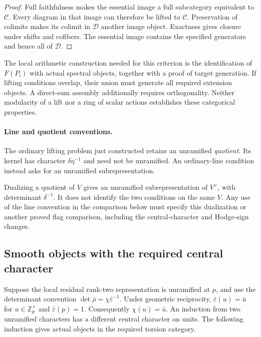 \begin{proof}
Full faithfulness makes the essential image a full subcategory
equivalent to $\mathcal C$. Every diagram in that image can
therefore be lifted to $\mathcal C$.
Preservation of colimits makes its colimit in $\mathcal D$ another
image object. Exactness gives closure under shifts and cofibers.
The essential image contains the specified generators and hence
all of $\mathcal D$.
\end{proof}

The local arithmetic construction needed for this criterion is the
identification of $F(P_i)$ with actual spectral objects, together
with a proof of target generation. If lifting conditions overlap,
their union must generate all required extension objects.
A direct-sum assembly additionally requires orthogonality.
Neither modularity of a lift nor a ring of scalar actions establishes
these categorical properties.

\paragraph{Line and quotient conventions.}
The ordinary lifting problem just constructed retains an unramified
\emph{quotient}. Its kernel has character $\delta\eta^{-1}$ and need
not be unramified. An ordinary-line condition instead asks for
an unramified subrepresentation.

Dualizing a quotient
of $V$ gives an unramified subrepresentation of $V^\vee$, with determinant
$\delta^{-1}$. It does not identify the two conditions on the same $V$.
Any use of the line convention in the comparison below must specify
this dualization or another proved flag comparison, including the
central-character and Hodge-sign changes.


\subsection{Smooth objects with the required central character}

Suppose the local residual rank-two representation is unramified
at \(p\), and use the determinant convention
\(\det\bar\rho=\chi\bar\varepsilon^{-1}\).
Under geometric reciprocity,
\(\bar\varepsilon(u)=\bar u\) for \(u\in\mathbb Z_p^\times\)
and \(\bar\varepsilon(p)=1\).
Consequently \(\chi(u)=\bar u\).
An induction from two unramified characters has a different
central character on units. The following induction gives actual
objects in the required torsion category.

